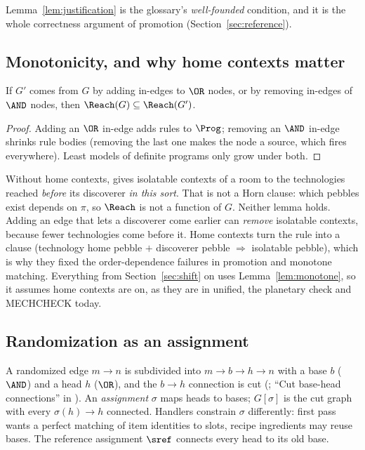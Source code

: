 Lemma~\ref{lem:justification} is the glossary's \emph{well-founded} condition, and it is the whole correctness argument of promotion (Section~\ref{sec:reference}).

\subsection{Monotonicity, and why home contexts matter}

\begin{lemma}[Monotonicity]\label{lem:monotone}
If $G'$ comes from $G$ by adding in-edges to $\OR$ nodes, or by removing in-edges of $\AND$ nodes, then $\Reach(G)\subseteq\Reach(G')$.
\end{lemma}
\begin{proof}
Adding an $\OR$ in-edge adds rules to $\Prog$; removing an $\AND$ in-edge shrinks rule bodies (removing the last one makes the node a source, which fires everywhere). Least models of definite programs only grow under both.
\end{proof}

\begin{remark}\label{rem:discovery}
Without home contexts,  gives isolatable contexts of a room to the technologies reached \emph{before} its discoverer \emph{in this sort}. That is not a Horn clause: which pebbles exist depends on $\pi$, so $\Reach$ is not a function of $G$. Neither lemma holds. Adding an edge that lets a discoverer come earlier can \emph{remove} isolatable contexts, because fewer technologies come before it. Home contexts turn the rule into a clause (technology home pebble $+$ discoverer pebble $\Rightarrow$ isolatable pebble), which is why they fixed the order-dependence failures in promotion and monotone matching. Everything from Section~\ref{sec:shift} on uses Lemma~\ref{lem:monotone}, so it assumes home contexts are on, as they are in unified, the planetary check and MECHCHECK today.
\end{remark}

\subsection{Randomization as an assignment}

A randomized edge $m\to n$ is subdivided into $m\to b\to h\to n$ with a base $b$ ($\AND$) and a head $h$ ($\OR$), and the $b\to h$ connection is cut (; ``Cut base-head connections'' in ). An \emph{assignment} $\sigma$ maps heads to bases; $G[\sigma]$ is the cut graph with every $\sigma(h)\to h$ connected. Handlers constrain $\sigma$ differently: first pass wants a perfect matching of item identities to slots, recipe ingredients may reuse bases. The reference assignment $\sref$ connects every head to its old base.

